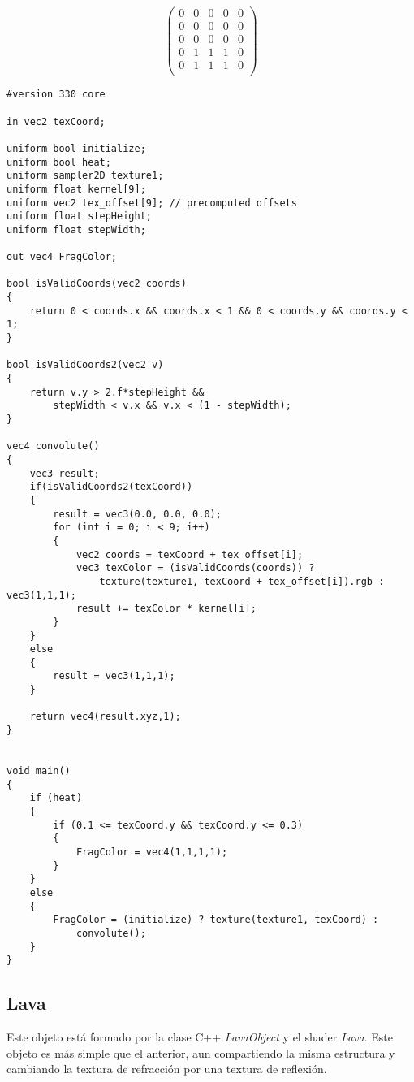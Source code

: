 \documentclass[12pt]{article}%
\begin{document}
\begin{equation}
	\begin{pmatrix}
		0 & 0 & 0 & 0 & 0 \\
		0 & 0 & 0 & 0 & 0 \\
		0 & 0 & 0 & 0 & 0 \\
		0 & 1 & 1 & 1 & 0 \\
		0 & 1 & 1 & 1 & 0 \\
	\end{pmatrix}
	\label{conv-matrix}
\end{equation}

\begin{lstlisting}[style=glsl]
#version 330 core

in vec2 texCoord;

uniform bool initialize;
uniform bool heat;
uniform sampler2D texture1;
uniform float kernel[9];
uniform vec2 tex_offset[9]; // precomputed offsets
uniform float stepHeight;
uniform float stepWidth;

out vec4 FragColor;

bool isValidCoords(vec2 coords)
{
	return 0 < coords.x && coords.x < 1 && 0 < coords.y && coords.y < 1;
}

bool isValidCoords2(vec2 v)
{
	return v.y > 2.f*stepHeight &&
		stepWidth < v.x && v.x < (1 - stepWidth);
}

vec4 convolute()
{
	vec3 result;
	if(isValidCoords2(texCoord))
	{
		result = vec3(0.0, 0.0, 0.0);
		for (int i = 0; i < 9; i++)
		{
			vec2 coords = texCoord + tex_offset[i];
			vec3 texColor = (isValidCoords(coords)) ?
				texture(texture1, texCoord + tex_offset[i]).rgb : vec3(1,1,1);
			result += texColor * kernel[i];
		}
	}
	else
	{
		result = vec3(1,1,1);
	}

	return vec4(result.xyz,1);
}


void main()
{
	if (heat)
	{
		if (0.1 <= texCoord.y && texCoord.y <= 0.3)
		{
			FragColor = vec4(1,1,1,1);
		}
	}
	else
	{
		FragColor = (initialize) ? texture(texture1, texCoord) :
			convolute();
	}
}
\end{lstlisting}
	
\subsection{Lava}
	Este objeto está formado por la clase C++ \textit{LavaObject} y el shader \textit{Lava}. Este objeto es más simple que el anterior, aun compartiendo la misma estructura y cambiando la textura de refracción por una textura de reflexión.
	
\end{document}
